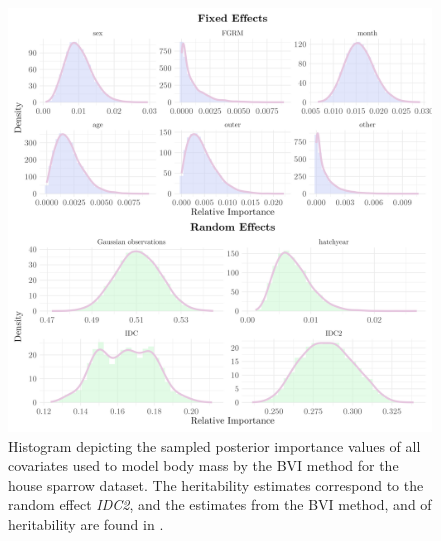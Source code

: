 \begin{figure}[H]
  \centering
  \includegraphics[width=1\linewidth]{Figures/House sparrow study/Mass_ccd.png}
  \caption[Estimated posterior importance of all covariates in the body mass model from the BVI method]{Histogram depicting the sampled posterior importance values of all covariates used to model body mass by the BVI method for the house sparrow dataset. The heritability estimates correspond to the random effect \textit{IDC2}, and the estimates from the BVI method, \citet{Silva2017} and \citet{Muff2019Genetic} of heritability are found in .}
  \label{fig:heritability_mass_combined}
\end{figure}

